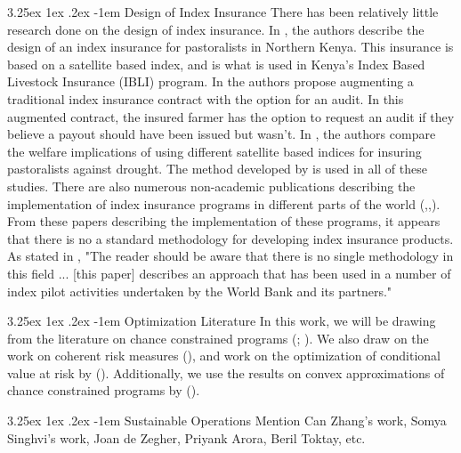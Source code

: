 \documentclass[11pt]{article}
\makeatletter
\renewcommand\paragraph{\@startsection{paragraph}{5}{\z@}%
  {3.25ex \@plus1ex \@minus.2ex}%
  {-1em}%
  {\normalfont\normalsize\bfseries}}
\makeatother
\begin{document}
\paragraph{Design of Index Insurance} There has been relatively little research done on the design of index insurance. In \cite{chantarat2013designing}, the authors describe the design of an index insurance for pastoralists in Northern Kenya. This insurance is based on a satellite based index, and is what is used in Kenya's Index Based Livestock Insurance (IBLI) program. In \cite{flatnes2018improving} the authors propose augmenting a traditional index insurance contract with the option for an audit. In this augmented contract, the insured farmer has the option to request an audit if they believe a payout should have been issued but wasn't. In \cite{jensen2019does}, the authors compare the welfare implications of using different satellite based indices for insuring pastoralists against drought. The method developed by \cite{chantarat2013designing} is used in all of these studies. There are also numerous non-academic publications describing the implementation of index insurance programs in different parts of the world (\cite{osgood2007designing},\cite{world2011weather},\cite{greatrex2015scaling}). From these papers describing the implementation of these programs, it appears that there is no a standard methodology for developing index insurance products. As stated in \cite{world2011weather}, "The reader should be aware that there is no single methodology in this field ... [this paper] describes an approach that has been used in a number of index pilot activities undertaken by the World Bank and its partners." 

\paragraph{Optimization Literature} In this work, we will be drawing from the literature on chance constrained programs (\cite{lagoa2005probabilistically}; \cite{charnes1958cost}). We also draw on the work on coherent risk measures (\cite{artzner1999coherent}), and work on the optimization of conditional value at risk by (\cite{rockafellar2000optimization}). Additionally, we use the results on convex approximations of chance constrained programs by (\cite{nemirovski2007convex}). 

\paragraph{Sustainable Operations} Mention Can Zhang's work, Somya Singhvi's work, Joan de Zegher, Priyank Arora, Beril Toktay, etc. 
\end{document}
